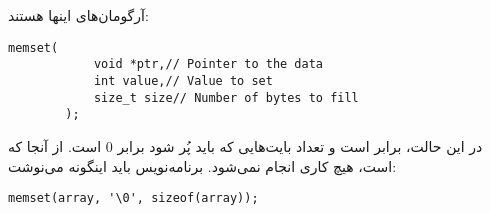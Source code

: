 \section{}
\paragraph{}\label{answer:20}
آرگومان‌های  اینها هستند:
\begin{LTR}
    \begin{lstlisting}[style=C++Style]
        memset(
            void *ptr,// Pointer to the data
            int value,// Value to set
            size_t size// Number of bytes to fill
        );
    \end{lstlisting}
\end{LTR}

در این حالت،  برابر  است و تعداد بایت‌هایی که باید پُر شود برابر 0 است. از آنجا که  است، هیچ کاری انجام نمی‌شود. برنامه‌نویس باید اینگونه می‌نوشت:
\begin{LTR}
        \begin{lstlisting}[style=C++Style]
              memset(array, '\0', sizeof(array));
        \end{lstlisting}
\end{LTR}
